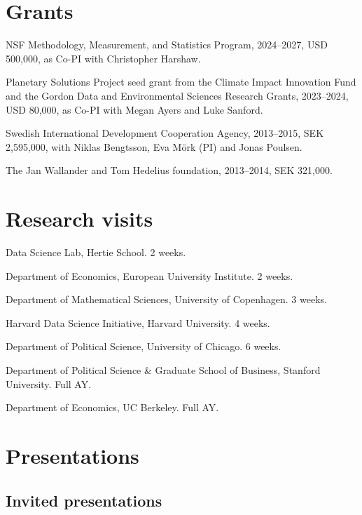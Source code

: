 \documentclass[10pt,letterpaper]{article}
\newenvironment{datelist}{
	\begin{list}{}{
		\setlength{\parskip}{0pt}
		\setlength{\itemsep}{4pt}
		\setlength{\parsep}{0.3em}
		\setlength{\leftmargin}{5.85em}
		\setlength{\labelwidth}{5.85em}
		\setlength{\labelsep}{1.5em}
		}
	}{
\end{list}
}
\newcommand{\dateitem}[2][]{\item[{#1}] {#2}}
\newenvironment{infolist}{
	\begin{list}{}{
		\setlength{\parskip}{0pt}
		\setlength{\itemsep}{4pt}
		\setlength{\parsep}{0.3em}
		\setlength{\leftmargin}{0em}
		\setlength{\labelwidth}{0em}
		}
	}{
\end{list}
}
\newcommand{\infoitem}[1]{\item {#1}}
\begin{document}
	\section*{Grants}

	\begin{infolist}
		\infoitem{NSF Methodology, Measurement, and Statistics Program, 2024--2027, USD 500,000, as Co-PI with Christopher Harshaw.}
		\infoitem{Planetary Solutions Project seed grant from the Climate Impact Innovation Fund and the Gordon Data and Environmental Sciences Research Grants, 2023--2024, USD 80,000, as Co-PI with Megan Ayers and Luke Sanford.}
		\infoitem{Swedish International Development Cooperation Agency, 2013--2015, SEK 2,595,000, with Niklas Bengtsson, Eva Mörk (PI) and Jonas Poulsen.}
		\infoitem{The Jan Wallander and Tom Hedelius foundation, 2013--2014, SEK 321,000.}
	\end{infolist}


	\section*{Research visits}

	\begin{datelist}
		\dateitem[2024]{Data Science Lab, Hertie School. 2 weeks.}
		\dateitem[2024]{Department of Economics, European University Institute. 2 weeks.}
		\dateitem[2024]{Department of Mathematical Sciences, University of Copenhagen. 3 weeks.}
		\dateitem[2024]{Harvard Data Science Initiative, Harvard University. 4 weeks.}
		\dateitem[2023]{Department of Political Science, University of Chicago. 6 weeks.}
		\dateitem[2019--2020]{Department of Political Science \& Graduate School of Business, Stanford University. Full AY.}
		\dateitem[2013--2014]{Department of Economics, UC Berkeley. Full AY.}
	\end{datelist}


	\section*{Presentations}

	\subsection*{Invited presentations}
\end{document}

